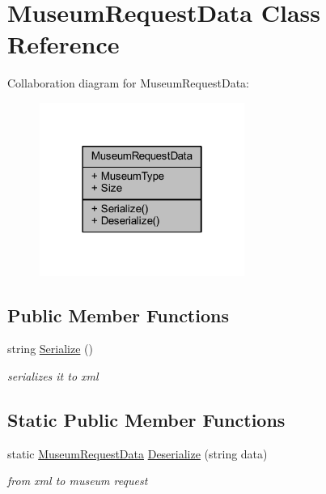 \hypertarget{class_museum_request_data}{}\section{Museum\+Request\+Data Class Reference}
\label{class_museum_request_data}


Collaboration diagram for Museum\+Request\+Data\+:
\nopagebreak
\begin{figure}[H]
\begin{center}
\leavevmode
\includegraphics[width=190pt]{class_museum_request_data__coll__graph}
\end{center}
\end{figure}
\subsection*{Public Member Functions}
\begin{DoxyCompactItemize}
\item 
string \mbox{\hyperlink{class_museum_request_data_ac2ab3cbc8d51ee55b5b23fe2cf9e93f3}{Serialize}} ()
\begin{DoxyCompactList}\small\item\em serializes it to xml \end{DoxyCompactList}\end{DoxyCompactItemize}
\subsection*{Static Public Member Functions}
\begin{DoxyCompactItemize}
\item 
static \mbox{\hyperlink{class_museum_request_data}{Museum\+Request\+Data}} \mbox{\hyperlink{class_museum_request_data_a927b5c1b4ac92161315f7bb717b7c6e6}{Deserialize}} (string data)
\begin{DoxyCompactList}\small\item\em from xml to museum request \end{DoxyCompactList}\end{DoxyCompactItemize}
